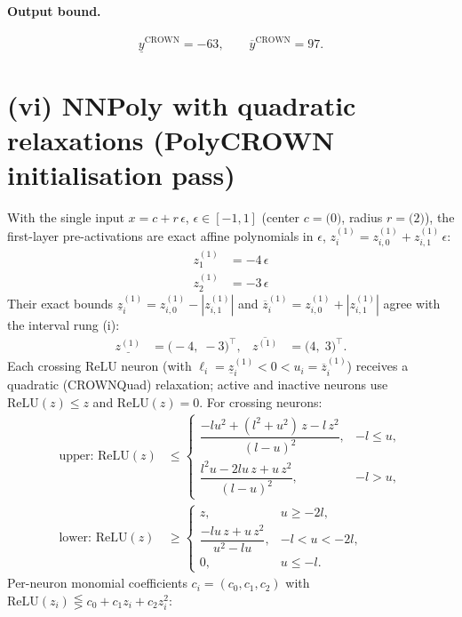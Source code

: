 \documentclass[11pt]{article}
\begin{document}
\paragraph{Output bound.}
\begin{equation*}
\underline{y}^{\text{CROWN}} = -63, \qquad \overline{y}^{\text{CROWN}} = 97.
\end{equation*}

\section{(vi) NNPoly with quadratic relaxations (PolyCROWN initialisation pass)}
With the single input $x = c + r\,\epsilon$, $\epsilon \in [-1, 1]$ (center $c = \bigl(0\bigr)$, radius $r = \bigl(2\bigr)$), the first-layer pre-activations are exact affine polynomials in $\epsilon$, $z^{(1)}_i = z^{(1)}_{i,0} + z^{(1)}_{i,1}\,\epsilon$:
\begin{align*}
z^{(1)}_{1} &= -4\,\epsilon \\
z^{(1)}_{2} &= -3\,\epsilon
\end{align*}
Their exact bounds $\underline{z}^{(1)}_i = z^{(1)}_{i,0} - |z^{(1)}_{i,1}|$ and $\overline{z}^{(1)}_i = z^{(1)}_{i,0} + |z^{(1)}_{i,1}|$ agree with the interval rung (i):
\begin{align*}
\underline{z^{(1)}} &= \bigl(-4,\; -3\bigr)^{\!\top}, & \overline{z^{(1)}} &= \bigl(4,\; 3\bigr)^{\!\top}.
\end{align*}
Each crossing ReLU neuron (with $\ell_i = \underline{z}^{(1)}_i < 0 < u_i = \overline{z}^{(1)}_i$)
receives a quadratic (CROWNQuad) relaxation; active and inactive neurons use $\mathrm{ReLU}(z) \le z$
and $\mathrm{ReLU}(z) = 0$. For crossing neurons:
\begin{align*}
\text{upper: } \mathrm{ReLU}(z) &\le \begin{cases} \dfrac{-l u^2 + (l^2 + u^2)\, z - l\, z^2}{(l - u)^2}, & -l \le u, \\[3mm] \dfrac{l^2 u - 2 l u\, z + u\, z^2}{(l - u)^2}, & -l > u, \end{cases} \\[2mm]
\text{lower: } \mathrm{ReLU}(z) &\ge \begin{cases} z, & u \ge -2l, \\[3mm] \dfrac{-l u\, z + u\, z^2}{u^2 - l u}, & -l < u < -2l, \\[3mm] 0, & u \le -l. \end{cases}
\end{align*}
Per-neuron monomial coefficients $c_i = (c_0, c_1, c_2)$ with $\mathrm{ReLU}(z_i) \lesseqgtr c_0 + c_1 z_i + c_2 z_i^2$:
\end{document}

